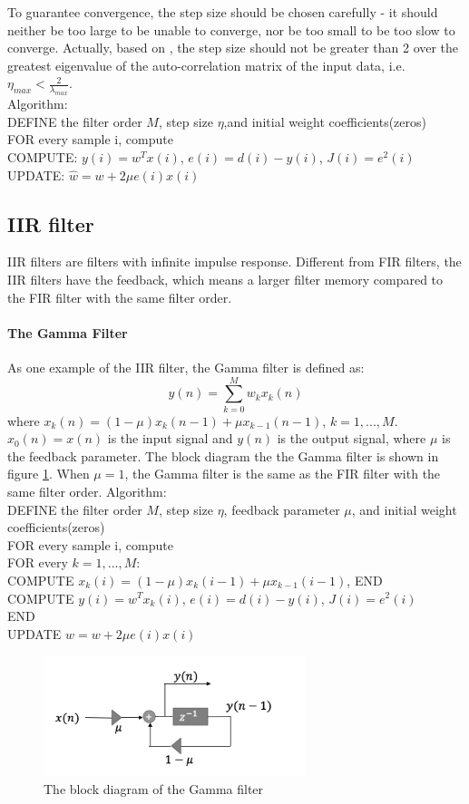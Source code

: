 \documentclass[conference]{IEEEtran}
\begin{document}
To guarantee convergence, the step size should be chosen carefully - it should neither be too large to be unable to converge, nor be too small to be too slow to converge. Actually, based on \cite{b3}, the step size should not be greater than 2 over the greatest eigenvalue of the auto-correlation matrix of the input data, i.e. $\eta_{max} < \frac{2}{\lambda_{max}}$.\\

		Algorithm:\\
		 DEFINE the filter order $M$, step size $\eta$,and initial weight coefficients(zeros)\\
		FOR every sample i, compute\\
		COMPUTE: $y(i) = w^{T}x(i)$, $e(i) = d(i) - y(i)$, $J(i) = e^{2}(i)$\\
		UPDATE: $\hat w = w+2\mu e(i)x(i)$

	\subsection{IIR filter} IIR filters are filters with infinite impulse response\cite{b4}. Different from FIR filters, the IIR filters have the feedback, which means a larger filter memory compared to the FIR filter with the same filter order.
		\paragraph{The Gamma Filter} As one example of the IIR filter, the Gamma filter is defined as\cite{b5}:
		\begin{equation}y(n) = \sum_{k=0}^{M}w_kx_k(n)\label{5}\end{equation}
	where $x_k(n)=(1-\mu)x_k(n-1) + \mu x_{k-1}(n-1)$, $k = 1,...,M$. $x_0(n) = x(n)$ is the input signal and $y(n)$ is the output signal, where $\mu$ is the feedback parameter. The block diagram the the Gamma filter is shown in figure \ref{diagramGamma}. When $\mu = 1$, the Gamma filter is the same as the FIR filter with the same filter order. 
			Algorithm:\\
		 DEFINE the filter order $M$, step size $\eta$, feedback parameter $\mu$, and initial weight coefficients(zeros)\\
		FOR every sample i, compute\\
		FOR every $k = 1,..., M$:\\
		COMPUTE $x_k(i) = (1-\mu)x_{k}(i-1) + \mu x_{k-1}(i-1)$,
		END\\
		COMPUTE $y(i) = w^{T}x_k(i)$, $e(i) = d(i) - y(i)$, $J(i) = e^{2}(i)$\\
		END\\
		UPDATE $\hat w = w+2\mu e(i)x(i)$
	\begin{figure}[tbp]
	\centerline{\includegraphics[width=3in]{gammafilterblock.jpg}}
	\caption{The block diagram of the Gamma filter}
	\label{diagramGamma}
	\end{figure}
	
\end{document}
